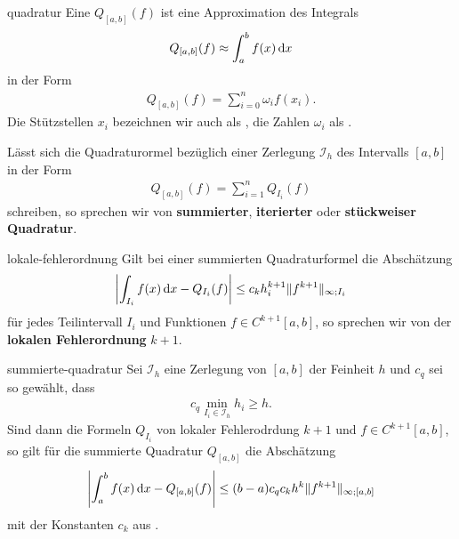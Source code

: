 \begin{Definition}{quadratur}
  Eine  $Q_{[a,b]}(f)$ ist eine Approximation
  des Integrals
  \begin{gather}
    Q_{[a,b]}(f) \approx \int_a^b f(x)\,\mathrm{d} x
  \end{gather}
  in der Form
  \begin{gather}
    Q_{[a,b]}(f) = \sum_{i=0}^n \omega_i f(x_i).
  \end{gather}
  Die Stützstellen $x_i$ bezeichnen wir auch als
  , die Zahlen $\omega_i$ als
  .

  Lässt sich die Quadraturormel bezüglich einer Zerlegung
  $\mathcal I_h$ des Intervalls $[a,b]$ in der Form
  \begin{gather}
    Q_{[a,b]}(f) = \sum_{i=1}^n Q_{I_i} (f)
  \end{gather}
  schreiben, so sprechen wir von \textbf{summierter},
  \textbf{iterierter} oder \textbf{stückweiser Quadratur}.
\end{Definition}

\begin{Definition}{lokale-fehlerordnung}
  Gilt bei einer summierten Quadraturformel die Abschätzung
  \begin{gather}
    \left|\int_{I_i} f(x)\,\mathrm{d} x - Q_{I_i}(f)\right|
    \le c_k h_i^{k+1} \lVert f^{k+1}\rVert_{\infty;I_i}
  \end{gather}
  für jedes Teilintervall $I_i$ und Funktionen $f\in C^{k+1}[a,b]$, so
  sprechen wir von der \textbf{lokalen
    Fehlerordnung} $k+1$.
\end{Definition}

\begin{Satz}{summierte-quadratur}
  Sei $\mathcal I_h$ eine Zerlegung von $[a,b]$ der Feinheit $h$ und
  $c_q$ sei so gewählt, dass
  \begin{gather}
    c_q \min_{I_i\in \mathcal I_h} h_i \ge h.
  \end{gather}
  Sind dann die Formeln $Q_{I_i}$ von lokaler Fehlerodrdung $k+1$ und
  $f\in C^{k+1}[a,b]$, so gilt für die summierte Quadratur $Q_{[a,b]}$
  die Abschätzung
  \begin{gather}
    \left|\int_a^b f(x)\,\mathrm{d} x - Q_{[a,b]}(f)\right| \le (b-a) c_q c_k h^{k}
    \lVert f^{k+1}\rVert_{\infty;[a,b]}
  \end{gather}
  mit der Konstanten $c_k$ aus .
\end{Satz}

